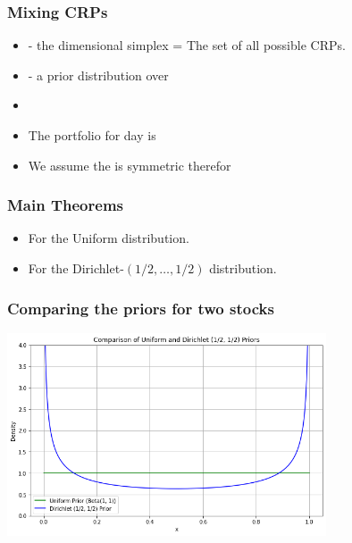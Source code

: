 \documentclass{beamer}
\begin{document}
\begin{small}
\begin{frame}
  \frametitle{Mixing CRPs}
  \begin{itemize}
  \item \R{$\cB$} - the  dimensional simplex = The set of all possible CRPs.
  \item \R{$\mu$} - a prior distribution over \R{$\cB$}
  \item {}
  \item The portfolio for day  is
    \R{
    \[
\hat{\mathbf{b}}_{i}
\;=\;
\hat{\mathbf{b}}_{i}\bigl(\mathbf{x}^{\,i-1}\bigr)
\;=\;
\frac{\displaystyle\int_{\mathcal{B}} \mathbf{b}\,S_{i-1}\!\bigl(\mathbf{b},\,\mathbf{x}^{\,i-1}\bigr)\,\mathrm{d}\mu(\mathbf{b})}
     {\displaystyle\int_{\mathcal{B}} S_{i-1}\!\bigl(\mathbf{b},\,\mathbf{x}^{\,i-1}\bigr)\,\mathrm{d}\mu(\mathbf{b})},
\quad i = 1,2,\dots
\]}
  \item We assume the \R{$\mu$} is symmetric therefor 
  \end{itemize}
\end{frame}

\begin{frame}
  \frametitle{Main Theorems}
  \begin{itemize}
  \item  {} For the Uniform distribution.\\


  \item {} For the Dirichlet-$(1/2,\ldots,1/2)$ distribution.

  \end{itemize}
\end{frame}

 \begin{frame}
\frametitle{Comparing the priors for two stocks}
\includegraphics[height=6cm]{figures/dirichlet.png}
\end{frame}



\end{small}
\end{document}
